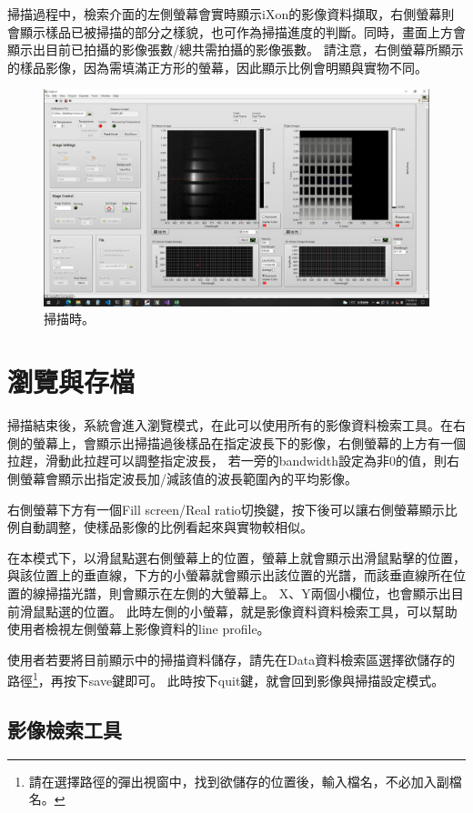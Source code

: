 \documentclass[12pt]{article}
\begin{document}
    掃描過程中，檢索介面的左側螢幕會實時顯示iXon的影像資料擷取，右側螢幕則會顯示樣品已被掃描的部分之樣貌，也可作為掃描進度的判斷。同時，畫面上方會顯示出目前已拍攝的影像張數/總共需拍攝的影像張數。
    請注意，右側螢幕所顯示的樣品影像，因為需填滿正方形的螢幕，因此顯示比例會明顯與實物不同。
    \begin{figure}[h]
        \centering
        \includegraphics[width=\linewidth]{scanning.jpeg}
        \caption{掃描時。}
        \label{fig: scanning}
    \end{figure}
    \section{瀏覽與存檔}\label{sec: browse}
    掃描結束後，系統會進入瀏覽模式，在此可以使用所有的影像資料檢索工具。在右側的螢幕上，會顯示出掃描過後樣品在指定波長下的影像，右側螢幕的上方有一個拉趕，滑動此拉趕可以調整指定波長，
    若一旁的bandwidth設定為非0的值，則右側螢幕會顯示出指定波長加/減該值的波長範圍內的平均影像。

    右側螢幕下方有一個Fill screen/Real ratio切換鍵，按下後可以讓右側螢幕顯示比例自動調整，使樣品影像的比例看起來與實物較相似。

    在本模式下，以滑鼠點選右側螢幕上的位置，螢幕上就會顯示出滑鼠點擊的位置，與該位置上的垂直線，下方的小螢幕就會顯示出該位置的光譜，而該垂直線所在位置的線掃描光譜，則會顯示在左側的大螢幕上。
    X、Y兩個小欄位，也會顯示出目前滑鼠點選的位置。
    此時左側的小螢幕，就是影像資料資料檢索工具，可以幫助使用者檢視左側螢幕上影像資料的line profile。

    使用者若要將目前顯示中的掃描資料儲存，請先在Data資料檢索區選擇欲儲存的路徑\footnote{請在選擇路徑的彈出視窗中，找到欲儲存的位置後，輸入檔名，不必加入副檔名。}，再按下save鍵即可。
    此時按下quit鍵，就會回到影像與掃描設定模式。
    \subsection{影像檢索工具}\label{sec: browse tool}
\end{document}
